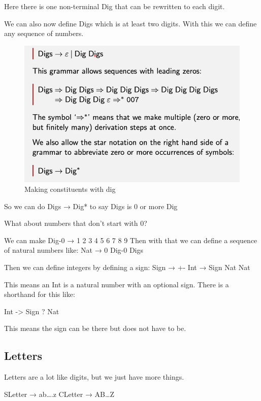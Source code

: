 \documentclass[
  11pt,
  british,
]{article}
\begin{document}
Here there is one non-terminal Dig that can be rewritten to each digit.

We can also now define Digs which is at least two digits. With this we
can define any sequence of numbers.

\begin{figure}
\centering
\includegraphics{Pasted_image_20211127132647.png}
\caption{Making constituents with dig}
\end{figure}

So we can do Digs → Dig* to say Digs is 0 or more Dig

What about numbers that don't start with 0?

We can make Dig-0 → 1 \textbar{} 2 \textbar{} 3 \textbar{} 4 \textbar{}
5 \textbar{} 6 \textbar{} 7 \textbar{} 8 \textbar{} 9 Then with that we
can define a sequence of natural numbers like: Nat → 0 \textbar{} Dig-0
\textbar{} Digs

Then we can define integers by defining a sign: Sign → +\textbar- Int →
Sign Nat \textbar{} Nat

This means an Int is a natural number with an optional sign. There is a
shorthand for this like:

Int -\textgreater{} Sign ? Nat

This means the sign can be there but does not have to be.

\hypertarget{letters}{%
\subsection{Letters}\label{letters}}

Letters are a lot like digits, but we just have more things.

SLetter → a\textbar b\textbar\ldots.\textbar z CLetter →
A\textbar B\textbar\ldots\textbar Z
\end{document}

